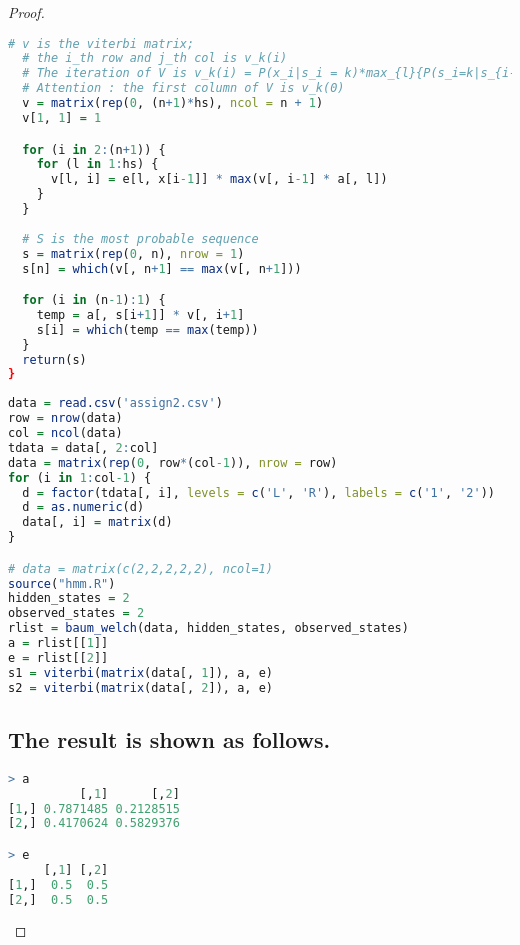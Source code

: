 \documentclass{article}
\begin{document}
\begin{proof}
\begin{lstlisting}[language = {R}]
  # v is the viterbi matrix;
  # the i_th row and j_th col is v_k(i)
  # The iteration of V is v_k(i) = P(x_i|s_i = k)*max_{l}{P(s_i=k|s_{i-1} = l)}v_l(i-1)
  # Attention : the first column of V is v_k(0)
  v = matrix(rep(0, (n+1)*hs), ncol = n + 1)
  v[1, 1] = 1

  for (i in 2:(n+1)) {
    for (l in 1:hs) {
      v[l, i] = e[l, x[i-1]] * max(v[, i-1] * a[, l])
    }
  }
  
  # S is the most probable sequence
  s = matrix(rep(0, n), nrow = 1)
  s[n] = which(v[, n+1] == max(v[, n+1]))

  for (i in (n-1):1) {
    temp = a[, s[i+1]] * v[, i+1]
    s[i] = which(temp == max(temp))
  }
  return(s)
}

\end{lstlisting}
\begin{lstlisting}[language = {R}]
data = read.csv('assign2.csv')
row = nrow(data)
col = ncol(data)
tdata = data[, 2:col]
data = matrix(rep(0, row*(col-1)), nrow = row)
for (i in 1:col-1) {
  d = factor(tdata[, i], levels = c('L', 'R'), labels = c('1', '2'))
  d = as.numeric(d)
  data[, i] = matrix(d)
}

# data = matrix(c(2,2,2,2,2), ncol=1)
source("hmm.R")
hidden_states = 2
observed_states = 2
rlist = baum_welch(data, hidden_states, observed_states)
a = rlist[[1]]
e = rlist[[2]]
s1 = viterbi(matrix(data[, 1]), a, e)
s2 = viterbi(matrix(data[, 2]), a, e)
\end{lstlisting}

\subsection{The result is shown as follows.}
\begin{lstlisting}[language = {R}]
> a
          [,1]      [,2]
[1,] 0.7871485 0.2128515
[2,] 0.4170624 0.5829376

> e
     [,1] [,2]
[1,]  0.5  0.5
[2,]  0.5  0.5


\end{lstlisting}
\end{proof}
\end{document}
